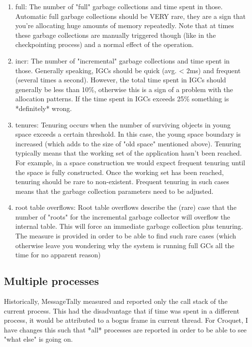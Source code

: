 \documentclass[a4paper,10pt,twoside]{book}
\begin{document}
\begin{enumerate}
\item full: The number of "full" garbage collections and time spent in
those. Automatic full garbage collections should be VERY rare, they are
a sign that you're allocating huge amounts of memory repeatedly. Note
that at times these garbage collections are manually triggered though
(like in the checkpointing process) and a normal effect of the operation.

\item incr: The number of "incremental" garbage collections and time spent
in those. Generally speaking, IGCs should be quick (avg. < 2ms) and
frequent (several times a second). However, the total time spent in IGCs
should generally be less than 10\%, otherwise this is a sign of a problem
with the allocation patterns. If the time spent in IGCs exceeds 25\%
something is *definitely* wrong.

\item tenures: Tenuring occurs when the number of surviving objects in young
space exceeds a certain threshold. In this case, the young space
boundary is increased (which adds to the size of "old space" mentioned
above). Tenuring typically means that the working set of the application
hasn't been reached. For example, in a space construction we would
expect frequent tenuring until the space is fully constructed. Once the
working set has been reached, tenuring should be rare to non-existent.
Frequent tenuring in such cases means that the garbage collection
parameters need to be adjusted.

\item root table overflows: Root table overflows describe the (rare) case
that the number of "roots" for the incremental garbage collector will
overflow the internal table. This will force an immediate garbage
collection plus tenuring. The measure is provided in order to be able to
find such rare cases (which otherwise leave you wondering why the system
is running full GCs all the time for no apparent reason)
\end{enumerate}


\subsection{Multiple processes}

Historically, MessageTally measured and reported only the call stack of
the current process. This had the disadvantage that if time was spent in
a different process, it would be attributed to a bogus frame in current
thread. For Croquet, I have changes this such that *all* processes are
reported in order to be able to see "what else" is going on.
\end{document}
